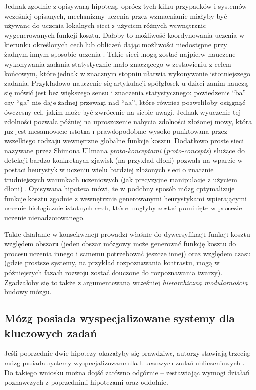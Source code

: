 Jednak zgodnie z opisywaną hipotezą, oprócz tych kilku przypadków i systemów wcześniej opisanych,  mechanizmy uczenia przez wzmacnianie miałyby być używane do uczenia lokalnych sieci z użyciem różnych wewnętrznie wygenerowanych funkcji kosztu.
Dałoby to możliwość koordynowania uczenia w kierunku określonych cech lub obliczeń dając możliwości niedostępne przy żadnym innym sposobie uczenia \cite{ullman2012simple}.
Takie sieci mogą zostać najpierw nauczone wykonywania zadania statystycznie mało znaczącego w zestawieniu z celem końcowym, które jednak w znacznym stopniu ułatwia wykonywanie istotniejszego zadania.
Przykładowo nauczenie się artykulacji spółgłosek u dzieci zanim nauczą się mówić jest bez większego sensu i znaczenia statystycznego: powiedzenie ``ba'' czy ``ga'' nie daje żadnej przewagi nad ``aa'', które również pozwoliłoby osiągnąć ówczesny cel, jakim może być zwrócenie na siebie uwagi.
Jednak wyuczenie tej zdolności pozwala później na uproszczenie nabycia zdolności złożonej mowy, która już jest niesamowicie istotna i prawdopodobnie wysoko punktowana przez wszelkiego rodzaju wewnętrzne globalne funkcje kosztu.
Dodatkowo proste sieci nazywane przez Shimona Ullmana \emph{proto-konceptami} (\emph{proto-concepts}) służące do detekcji bardzo konkretnych zjawisk (na przykład dłoni) pozwala na wparcie w postaci heurystyk w uczeniu wielu bardziej złożonych sieci o znacznie trudniejszych warunkach uczeniowych (jak precyzyjne manipulacje z użyciem dłoni) \cite{ullman2012simple}.
Opisywana hipoteza mówi, że w podobny sposób mózg optymalizuje funkcje kosztu zgodnie z wewnętrznie generowanymi heurystykami wpierającymi uczenie biologicznie istotnych cech, które mogłyby zostać pominięte w procesie uczenie nienadzorowanego.

Takie działanie w konsekwencji prowadzi właśnie do dywersyfikacji funkcji kosztu względem obszaru (jeden obszar mózgowy może generować funkcję kosztu do procesu uczenia innego i samemu potrzebować jeszcze innej) oraz względem czasu (gdzie prostsze systemy, na przykład rozpoznawania kontrastu, mogą w późniejszych fazach rozwoju zostać douczone do rozpoznawania twarzy).
Zgadzałoby się to także z argumentowaną wcześniej \emph{hierarchiczną modularnością} budowy mózgu.

\subsection{Mózg posiada wyspecjalizowane systemy dla kluczowych zadań}

Jeśli poprzednie dwie hipotezy okazałyby się prawdziwe, autorzy stawiają trzecią: mózg posiada systemy wyspecjalizowane dla kluczowych zadań obliczeniowych \cite{marblestone2016toward}.
Do takiego wniosku można dojść zarówno odgórnie -- zestawiając wymogi działań poznawczych z poprzednimi hipotezami oraz oddolnie.

